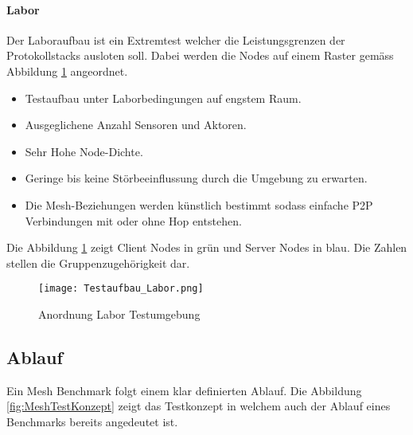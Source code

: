 \paragraph{Labor}
Der Laboraufbau ist ein Extremtest welcher die Leistungsgrenzen der Protokollstacks ausloten soll. Dabei werden die Nodes auf einem Raster gemäss Abbildung \ref{fig:AnordnungLaborTestumgebung} angeordnet.
\begin{itemize}
	\item Testaufbau unter Laborbedingungen auf engstem Raum.
	\item Ausgeglichene Anzahl Sensoren und Aktoren.
	\item Sehr Hohe Node-Dichte.
	\item Geringe bis keine Störbeeinflussung durch die Umgebung zu  erwarten.
	\item Die Mesh-Beziehungen werden künstlich bestimmt sodass einfache P2P Verbindungen mit oder ohne Hop entstehen.
\end{itemize}

Die Abbildung \ref{fig:AnordnungLaborTestumgebung} zeigt Client Nodes in grün und Server Nodes in blau. Die Zahlen stellen die Gruppenzugehörigkeit dar. 

\begin{figure}[H]
\centering
\texttt{[image: Testaufbau\_Labor.png]}
\caption{Anordnung Labor Testumgebung}\label{fig:AnordnungLaborTestumgebung}
\end{figure}
	



\subsection{Ablauf}\label{subsec:AblaufMesh}

Ein Mesh Benchmark folgt einem klar definierten Ablauf. Die Abbildung \ref{fig:MeshTestKonzept} zeigt das Testkonzept in welchem auch der Ablauf eines Benchmarks bereits angedeutet ist.

